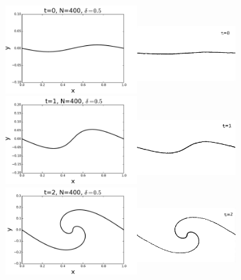 \documentclass[12pt,twoside]{article}
\begin{document}
\begin{figure}
\begin{center}
	\includegraphics[width=2in,height=1.33in]{K1.pdf}\includegraphics[width=1.5in,height=1.2in]{periodic1.png}\\
	
	\includegraphics[width=2in,height=1.33in]{K2.pdf}\includegraphics[width=1.5in,height=1.1in]{periodic2.png}\\
	
	\includegraphics[width=2in,height=1.33in]{K3.pdf}\includegraphics[width=1.5in,height=1.2in]{periodic3.png}
	

\end{center}
\end{figure}
\end{document}
